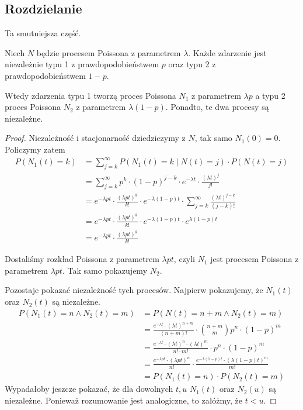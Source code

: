 \subsection{Rozdzielanie}
Ta smutniejsza część.
\begin{theorem}[Twierdzenie 8.13 P\&C]
    Niech \( N \) będzie procesem Poissona z parametrem \( \lambda \).
    Każde zdarzenie jest niezależnie typu 1 z prawdopodobieństwem \( p \) oraz typu 2 z prawdopodobieństwem \( 1 - p \).
    
    Wtedy zdarzenia typu 1 tworzą proces Poissona \( N_1 \) z parametrem \( \lambda p \) a typu 2 proces Poissona \( N_2 \) z parametrem \( \lambda (1-p) \). Ponadto, te dwa procesy są niezależne.
\end{theorem}
\begin{proof}
    Niezależność i stacjonarność dziedziczymy z \( N \), tak samo \( N_1(0) = 0 \).
    Policzymy zatem
    \begin{align*}
        P(N_1(t) = k)
            &= \sum_{j=k}^\infty P(N_1(t) = k \mid N(t) = j) \cdot P(N(t) = j) \\
            &= \sum_{j=k}^\infty p^k \cdot (1-p)^{j-k} \cdot e^{-\lambda t} \cdot \frac{(\lambda t)^j}{j!} \\
            &= e^{-\lambda p t} \cdot \frac{(\lambda p t)^k}{k!} \cdot e^{-\lambda (1 - p) t} \cdot
                \sum_{j=k}^\infty \frac{(\lambda t)^{j-k}}{(j-k)!} \\
            &= e^{-\lambda p t} \cdot \frac{(\lambda p t)^k}{k!} \cdot e^{-\lambda (1 - p) t}  \cdot e^{\lambda (1 - p) t} \\
            &= e^{-\lambda p t} \cdot \frac{(\lambda p t)^k}{k!}
    \end{align*}
    
    Dostaliśmy rozkład Poissona z parametrem \( \lambda p t \), czyli \( N_1 \) jest procesem Poissona z parametrem \( \lambda p t \). Tak samo pokazujemy \( N_2 \).
    
    Pozostaje pokazać niezależność tych procesów.
    Najpierw pokazujemy, że \( N_1(t) \) oraz \( N_2(t) \) są niezależne.
    \begin{align*}
        P(N_1(t) = n \land N_2(t) = m)
            &= P(N(t) = n + m \land N_2(t) = m) \\
            &= \frac{e^{-\lambda t}\cdot(\lambda t)^{n + m}}{(n + m)!} \cdot \binom{n + m}{m} p^n \cdot (1-p)^m \\
            &= \frac{e^{-\lambda t}\cdot(\lambda t)^n \cdot (\lambda t)^m}{n! \cdot m!} \cdot p^n \cdot (1-p)^m \\
            &= \frac{e^{-\lambda p t} \cdot (\lambda p t)^n}{n!} \cdot \frac{e^{-\lambda (1-p) t} \cdot (\lambda (1-p) t)^m}{m!} \\
            &= P(N_1(t) = n) \cdot P(N_2(t) = m)
    \end{align*}
    Wypadałoby jeszcze pokazać, że dla dowolnych \(t, u\) \( N_1(t) \) oraz \( N_2(u) \) są niezależne.
    Ponieważ rozumowanie jest analogiczne, to załóżmy, że \( t < u \).
    

\end{proof}
